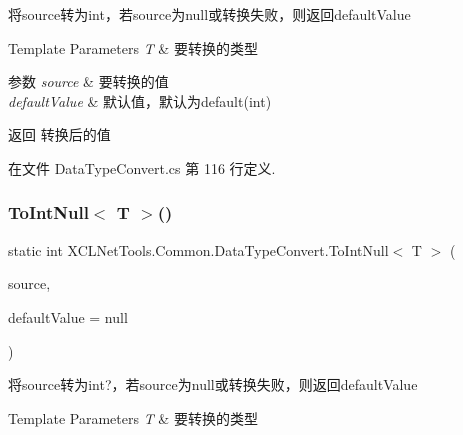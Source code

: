 将source转为int，若source为null或转换失败，则返回default\+Value 


\begin{DoxyTemplParams}{Template Parameters}
{\em T} & 要转换的类型\\
\hline
\end{DoxyTemplParams}

\begin{DoxyParams}{参数}
{\em source} & 要转换的值\\
\hline
{\em default\+Value} & 默认值，默认为default(int)\\
\hline
\end{DoxyParams}
\begin{DoxyReturn}{返回}
转换后的值
\end{DoxyReturn}


在文件 Data\+Type\+Convert.\+cs 第 116 行定义.

\mbox{\label{class_x_c_l_net_tools_1_1_common_1_1_data_type_convert_aaad571f931d166628e81452a709dcc38}} 
\subsubsection{\texorpdfstring{To\+Int\+Null$<$ T $>$()}{ToIntNull< T >()}}
{\footnotesize\ttfamily static int X\+C\+L\+Net\+Tools.\+Common.\+Data\+Type\+Convert.\+To\+Int\+Null$<$ T $>$ (\begin{DoxyParamCaption}\item[{T}]{source,  }\item[{int?}]{default\+Value = {\ttfamily null} }\end{DoxyParamCaption})\hspace{0.3cm}{\ttfamily [static]}}



将source转为int?，若source为null或转换失败，则返回default\+Value 


\begin{DoxyTemplParams}{Template Parameters}
{\em T} & 要转换的类型\\
\hline
\end{DoxyTemplParams}

